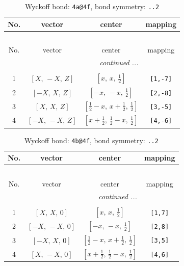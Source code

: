 \documentclass[fleqn,8pt]{jsarticle}
\begin{document}
\begin{longtable}{cccc}
\caption{Wyckoff bond: {\tt 4a@4f}, bond symmetry: {\tt ..2}}
 \\
 \hline \hline
No. & vector & center & mapping \\ \hline \endfirsthead

\multicolumn{3}{l}{\tablename\ \thetable{}} \\
 \hline \hline
No. & vector & center & mapping \\ \hline \endhead

 \hline \hline
\multicolumn{3}{r}{\footnotesize\it continued ...} \\ \endfoot

 \hline \hline
\multicolumn{3}{r}{} \\ \endlastfoot

1 & $\left[ X,\, - X,\, Z \right]$ & $\left[ x,\, x,\, \frac{1}{2} \right]$ & {\tt [1,-7]} \\ \hline
2 & $\left[ - X,\, X,\, Z \right]$ & $\left[ - x,\, - x,\, \frac{1}{2} \right]$ & {\tt [2,-8]} \\ \hline
3 & $\left[ X,\, X,\, Z \right]$ & $\left[ \frac{1}{2} - x,\, x + \frac{1}{2},\, \frac{1}{2} \right]$ & {\tt [3,-5]} \\ \hline
4 & $\left[ - X,\, - X,\, Z \right]$ & $\left[ x + \frac{1}{2},\, \frac{1}{2} - x,\, \frac{1}{2} \right]$ & {\tt [4,-6]} \\
\end{longtable}
\renewcommand{\arraystretch}{1.2}
\begin{longtable}{cccc}
\caption{Wyckoff bond: {\tt 4b@4f}, bond symmetry: {\tt ..2}}
 \\
 \hline \hline
No. & vector & center & mapping \\ \hline \endfirsthead

\multicolumn{3}{l}{\tablename\ \thetable{}} \\
 \hline \hline
No. & vector & center & mapping \\ \hline \endhead

 \hline \hline
\multicolumn{3}{r}{\footnotesize\it continued ...} \\ \endfoot

 \hline \hline
\multicolumn{3}{r}{} \\ \endlastfoot

1 & $\left[ X,\, X,\, 0 \right]$ & $\left[ x,\, x,\, \frac{1}{2} \right]$ & {\tt [1,7]} \\ \hline
2 & $\left[ - X,\, - X,\, 0 \right]$ & $\left[ - x,\, - x,\, \frac{1}{2} \right]$ & {\tt [2,8]} \\ \hline
3 & $\left[ - X,\, X,\, 0 \right]$ & $\left[ \frac{1}{2} - x,\, x + \frac{1}{2},\, \frac{1}{2} \right]$ & {\tt [3,5]} \\ \hline
4 & $\left[ X,\, - X,\, 0 \right]$ & $\left[ x + \frac{1}{2},\, \frac{1}{2} - x,\, \frac{1}{2} \right]$ & {\tt [4,6]} \\
\end{longtable}
\end{document}
